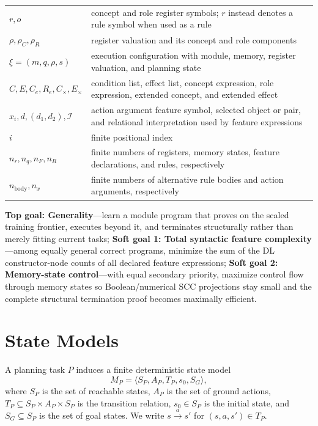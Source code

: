 \documentclass[11pt]{article}
\newenvironment{compacttable}
  {\begingroup\footnotesize\setlength{\tabcolsep}{3pt}}
  {\endgroup}
\begin{document}
\begin{compacttable}
\begin{longtable}{>{\raggedright\arraybackslash}p{}
                  >{\raggedright\arraybackslash}p{}}
$r,o$ & concept and role register symbols; $r$ instead denotes a rule symbol when used as a rule \\
$\rho,\rho_C,\rho_R$ & register valuation and its concept and role components \\
$\xi=(m,q,\rho,s)$ & execution configuration with module, memory, register valuation, and planning state \\
$C,E,C_e,R_e,C_{\times},E_{\times}$ & condition list, effect list, concept expression, role expression, extended concept, and extended effect \\
$x_i,d,(d_1,d_2),\mathcal{I}$ & action argument feature symbol, selected object or pair, and relational interpretation used by feature expressions \\
$i$ & finite positional index \\
$n_r,n_q,n_F,n_R$ & finite numbers of registers, memory states, feature declarations, and rules, respectively \\
$n_{\mathrm{body}},n_x$ & finite numbers of alternative rule bodies and action arguments, respectively \\
\bottomrule
\end{longtable}
\end{compacttable}

\noindent\textbf{Top goal: Generality}---learn a module program that proves on
the scaled training frontier, executes beyond it, and terminates structurally
rather than merely fitting current tasks;
\textbf{Soft goal 1: Total syntactic feature complexity}---among equally
general correct programs, minimize the sum of the DL constructor-node counts
of all declared feature expressions;
\textbf{Soft goal 2: Memory-state control}---with equal
secondary priority, maximize control flow through memory states so
Boolean/numerical SCC projections stay small and the complete structural
termination proof becomes maximally efficient.


\section{State Models}

A planning task $P$ induces a finite deterministic state model
\[
  M_P=\langle S_P,A_P,T_P,s_0,S_G\rangle,
\]
where $S_P$ is the set of reachable states, $A_P$ is the set
of ground actions, $T_P\subseteq S_P\times A_P\times
S_P$ is the transition relation, $s_0\in S_P$ is the
initial state, and $S_G\subseteq S_P$ is the set of goal states. We
write $s\xrightarrow{a}s'$ for $(s,a,s')\in T_P$.
\end{document}
